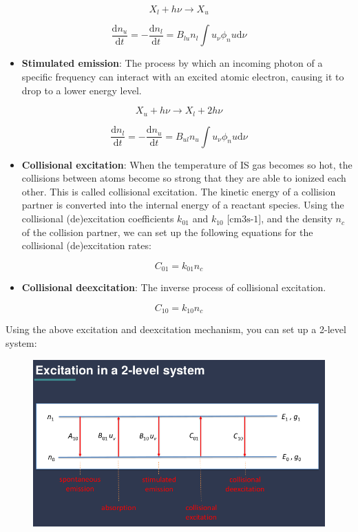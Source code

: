 \documentclass[11pt]{article}
\makeatletter
\def\maxwidth{\ifdim\Gin@nat@width>\linewidth\linewidth
    \else\Gin@nat@width\fi}
\let\Oldincludegraphics\includegraphics
\renewcommand{\includegraphics}[1]{\Oldincludegraphics[width=.8\maxwidth]{#1}}
\providecommand{\tightlist}{%
      \setlength{\itemsep}{0pt}\setlength{\parskip}{0pt}}
\makeatother
\begin{document}
\[ X_l + h\nu \rightarrow X_u \]

\[ \frac{\text{d}n_u}{\text{d}t} = - \frac{\text{d}n_l}{\text{d}t}= B_{lu}n_l \int u_\nu \phi_nu \text{d}\nu \]

\begin{itemize}
\tightlist
\item
  \textbf{Stimulated emission}: The process by which an incoming photon
  of a specific frequency can interact with an excited atomic electron,
  causing it to drop to a lower energy level.
\end{itemize}

\[ X_u + h\nu \rightarrow X_l + 2h\nu \]

\[ \frac{\text{d}n_l}{\text{d}t} = - \frac{\text{d}n_u}{\text{d}t}= B_{ul}n_u \int u_\nu \phi_nu \text{d}\nu \]

\begin{itemize}
\tightlist
\item
  \textbf{Collisional excitation}: When the temperature of IS gas
  becomes so hot, the collisions between atoms become so strong that
  they are able to ionized each other. This is called collisional
  excitation. The kinetic energy of a collision partner is converted
  into the internal energy of a reactant species. Using the collisional
  (de)excitation coefficients \(k_{01}\) and
  \(k_{10} \text{ [cm3s-1]}\), and the density \(n_c\) of the collision
  partner, we can set up the following equations for the collisional
  (de)excitation rates:
\end{itemize}

\[ C_{01} = k_{01} n_c \]

\begin{itemize}
\tightlist
\item
  \textbf{Collisional deexcitation}: The inverse process of collisional
  excitation.
\end{itemize}

\[ C_{10} = k_{10} n_c \]

Using the above excitation and deexcitation mechanism, you can set up a
2-level system:

\begin{figure}
\centering
\includegraphics{figs/fig_1.png}
\caption{}
\end{figure}
\end{document}
